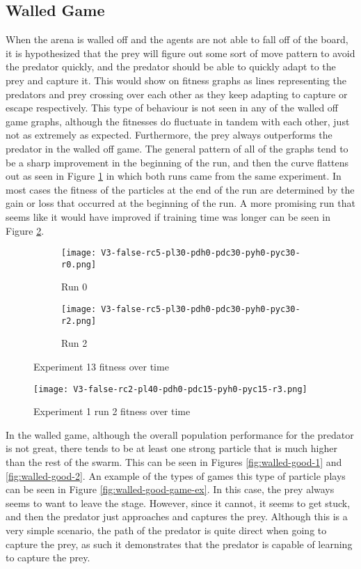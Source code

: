 \subsection{Walled Game}

When the arena is walled off and the agents are not able to fall off of the board, it is hypothesized that the prey will figure out some sort of move pattern to avoid the predator quickly, and the predator should be able to quickly adapt to the prey and capture it. This would show on fitness graphs as lines representing the predators and prey crossing over each other as they keep adapting to capture or escape respectively. This type of behaviour is not seen in any of the walled off game graphs, although the fitnesses do fluctuate in tandem with each other, just not as extremely as expected. Furthermore, the prey always outperforms the predator in the walled off game. The general pattern of all of the graphs tend to be a sharp improvement in the beginning of the run, and then the curve flattens out as seen in Figure \ref{fig:wall-exp-1} in which both runs came from the same experiment. In most cases the fitness of the particles at the end of the run are determined by the gain or loss that occurred at the beginning of the run. A more promising run that seems like it would have improved if training time was longer can be seen in Figure \ref{fig:walled-better-run}. 

\begin{figure}
  \centering
  \begin{subfigure}{0.7\textwidth}
  \texttt{[image: V3-false-rc5-pl30-pdh0-pdc30-pyh0-pyc30-r0.png]}
  \caption{Run 0}
  \end{subfigure}
  \begin{subfigure}{0.7\textwidth}
    \texttt{[image: V3-false-rc5-pl30-pdh0-pdc30-pyh0-pyc30-r2.png]}
    \caption{Run 2}
    \end{subfigure}
  \caption{Experiment 13 fitness over time}
  \label{fig:wall-exp-1}
\end{figure}

\begin{figure}
  
   \centering
  \texttt{[image: V3-false-rc2-pl40-pdh0-pdc15-pyh0-pyc15-r3.png]}  
  \caption{Experiment 1 run 2 fitness over time}
  \label{fig:walled-better-run}
  
\end{figure}

In the walled game, although the overall population performance for the predator is not great, there tends to be at least one strong particle that is much higher than the rest of the swarm. This can be seen in Figures \ref{fig:walled-good-1} and \ref{fig:walled-good-2}. An example of the types of games this type of particle plays can be seen in Figure \ref{fig:walled-good-game-ex}. In this case, the prey always seems to want to leave the stage. However, since it cannot, it seems to get stuck, and then the predator just approaches and captures the prey. Although this is a very simple scenario, the path of the predator is quite direct when going to capture the prey, as such it demonstrates that the predator is capable of learning to capture the prey.


